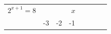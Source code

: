 {{\begin{center}
      \label{m39253*id154969}
      
    \noindent
      \tablelasttail{}
      \begin{xtabular}[t]{|l|l|l|l|l|l|l|l|}\hline
    
    
        
                \begin{math}{2}^{x+1}=8\end{math}
               &
     \tabularnewline{}
    
    
         &
    
    
        -3 &
    
    
        -2 &
    
    
        -1 &
    

\end{xtabular}
\end{center}}}
